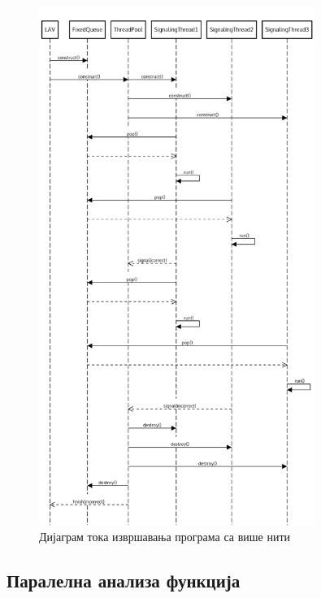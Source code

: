 \documentclass[12pt,oneside]{memoir}
\begin{document}
\begin{figure}[!ht]
  \centering
  \includegraphics[width=0.8\textwidth]{img/seq_diag.png}
  \caption{Дијаграм тока извршавања програма са више нити}
  \label{fig:sekv_dij}
\end{figure}

\subsection{Паралелна анализа функција}
\end{document}
